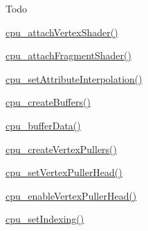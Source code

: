 \begin{DoxyRefDesc}{Todo}
\begin{DoxyItemize}
\item \hyperlink{program_8h_aaefc7833a6deea461cc06d00318f7975}{cpu\-\_\-attach\-Vertex\-Shader()}
\item \hyperlink{program_8h_a402ad69a9f1b80b8de408b991e190ed6}{cpu\-\_\-attach\-Fragment\-Shader()}
\item \hyperlink{program_8h_aca1c5019ec58c919160c4c12a5e5fa06}{cpu\-\_\-set\-Attribute\-Interpolation()}
\item \hyperlink{buffer_8h_a6ba9c58dc4b7bc81e83d3dae3c6b292f}{cpu\-\_\-create\-Buffers()}
\item \hyperlink{buffer_8h_aad292278b58c11db74df3cb3e3a52f22}{cpu\-\_\-buffer\-Data()}
\item \hyperlink{vertexPuller_8h_a3b9678475f48f09c3ddbd4316fce3e08}{cpu\-\_\-create\-Vertex\-Pullers()}
\item \hyperlink{vertexPuller_8h_a07be46ae38b8ec80ec85581a33b02786}{cpu\-\_\-set\-Vertex\-Puller\-Head()}
\item \hyperlink{vertexPuller_8h_afc4c70416bc0e515e75ec90c8c8d1584}{cpu\-\_\-enable\-Vertex\-Puller\-Head()}
\item \hyperlink{vertexPuller_8h_aa312eaf555d453ead6a430f8f058c9a6}{cpu\-\_\-set\-Indexing()} 
\end{DoxyItemize}\end{DoxyRefDesc}
